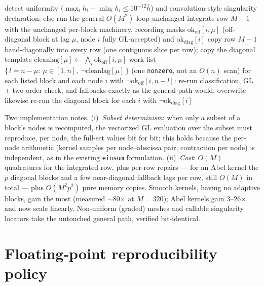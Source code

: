 \documentclass[11pt]{article}
\begin{document}
\begin{algorithm}[t]
\caption{Uniform-mesh weight-tensor assembly}
\label{alg:assembly}
\begin{algorithmic}[1]
\State detect uniformity ($\max_l h_l-\min_l h_l\le10^{-12}\bar h$) and
  convolution-style singularity declaration; else run the general
  $O(M^2)$ loop unchanged
\State integrate row $M{-}1$ with the unchanged per-block machinery,
  recording masks $\mathrm{ok}_{\mathrm{off}}[i,\mu]$ (off-diagonal
  block at lag $\mu$, node $i$ fully GL-accepted) and
  $\mathrm{ok}_{\mathrm{diag}}[i]$
\State copy row $M{-}1$ band-diagonally into every row (one contiguous
  slice per row); copy the diagonal template
\State $\mathrm{cleanlag}[\mu]\gets\bigwedge_i\mathrm{ok}_{\mathrm{off}}[i,\mu]$
  \State work list $\{\,l=n-\mu:\ \mu\in[1,n],\ \neg\mathrm{cleanlag}[\mu]\,\}$
    (one \texttt{nonzero}, not an $O(n)$ scan)
  \State for each listed block and each node $i$ with
    $\neg\mathrm{ok}_{\mathrm{off}}[i,n-l]$: re-run classification, GL +
    two-order check, and fallbacks exactly as the general path would;
    overwrite
  \State likewise re-run the diagonal block for each $i$ with
    $\neg\mathrm{ok}_{\mathrm{diag}}[i]$
\EndFor
\end{algorithmic}
\end{algorithm}

Two implementation notes. (i)~\emph{Subset determinism}: when only a
subset of a block's nodes is recomputed, the vectorized GL evaluation
over the subset must reproduce, per node, the full-set values bit for
bit; this holds because the per-node arithmetic (kernel samples per
node--abscissa pair, contraction per node) is independent, as in the
existing \texttt{einsum} formulation. (ii)~\emph{Cost}: $O(M)$
quadratures for the integrated row, plus per-row repairs --- for an
Abel kernel the $p$ diagonal blocks and a few near-diagonal fallback
lags per row, still $O(M)$ in total --- plus $O(M^2p^2)$ pure memory
copies. Smooth kernels, having no adaptive blocks, gain the most
(measured $\sim$80$\times$ at $M=320$); Abel kernels gain
3--26$\times$ and now scale linearly. Non-uniform (graded) meshes and
callable singularity locators take the untouched general path,
verified bit-identical.

\section{Floating-point reproducibility policy}
\label{sec:fp}
\end{document}
